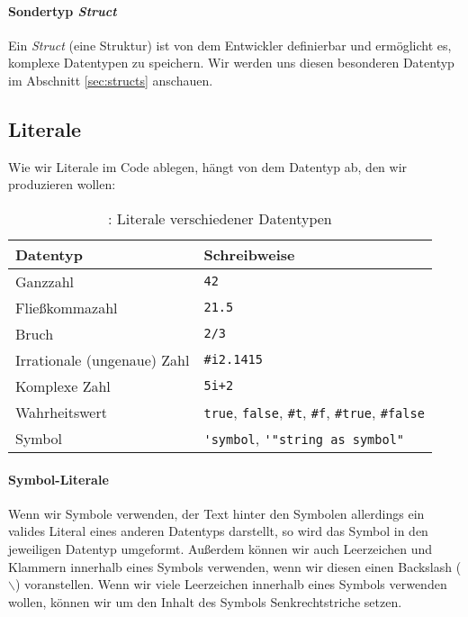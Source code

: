 	\paragraph{Sondertyp \textit{Struct}}
		Ein \textit{Struct} (eine Struktur) ist von dem Entwickler definierbar und ermöglicht es, komplexe Datentypen zu speichern. Wir werden uns diesen besonderen Datentyp im Abschnitt \ref{sec:structs} anschauen.

\subsection{Literale}
	
	Wie wir Literale im Code ablegen, hängt von dem Datentyp ab, den wir produzieren wollen:
	
	
	\begin{table}[H]
		\centering
		\begin{tabular}{l | l}
			\textbf{Datentyp} & \textbf{Schreibweise} \\ \hline
			Ganzzahl & \lstinline[language = Racket]|42| \\
			Fließkommazahl & \lstinline[language = Racket]|21.5| \\
			Bruch & \lstinline[language = Racket]|2/3| \\
			Irrationale (ungenaue) Zahl & \lstinline[language = Racket]|#i2.1415| \\
			Komplexe Zahl & \lstinline[language = Racket]|5i+2| \\
			Wahrheitswert & \lstinline[language = Racket]|true|, \lstinline[language = Racket]|false|, \lstinline[language = Racket]|#t|, \lstinline[language = Racket]|#f|, \lstinline[language = Racket]|#true|, \lstinline[language = Racket]|#false| \\
			Symbol & \lstinline[language = Racket]|'symbol|, \lstinline[language = Racket]|'"string as symbol"| \\
		\end{tabular}
		\caption{\racket: Literale verschiedener Datentypen}
	\end{table}

	\paragraph{Symbol-Literale}
		Wenn wir Symbole verwenden, der Text hinter den Symbolen allerdings ein valides Literal eines anderen Datentyps darstellt, so wird das Symbol in den jeweiligen Datentyp umgeformt. Außerdem können wir auch Leerzeichen und Klammern innerhalb eines Symbols verwenden, wenn wir diesen einen Backslash (\(\backslash\)) voranstellen. Wenn wir viele Leerzeichen innerhalb eines Symbols verwenden wollen, können wir um den Inhalt des Symbols Senkrechtstriche setzen.
		
